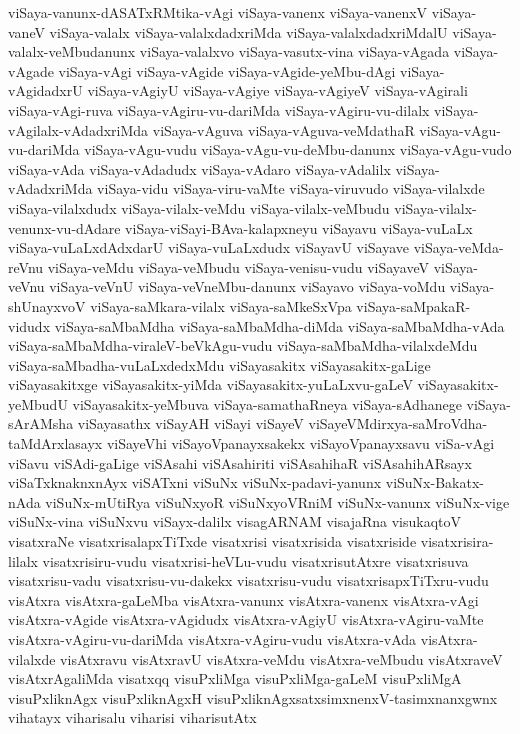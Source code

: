 {viSaya-vanunx-dASATxRMtika-vAgi
viSaya-vanenx
viSaya-vanenxV
viSaya-vaneV
viSaya-valalx
viSaya-valalxdadxriMda
viSaya-valalxdadxriMdalU
viSaya-valalx-veMbudanunx
viSaya-valalxvo
viSaya-vasutx-vina
viSaya-vAgada
viSaya-vAgade
viSaya-vAgi
viSaya-vAgide
viSaya-vAgide-yeMbu-dAgi
viSaya-vAgidadxrU
viSaya-vAgiyU
viSaya-vAgiye
viSaya-vAgiyeV
viSaya-vAgirali
viSaya-vAgi-ruva
viSaya-vAgiru-vu-dariMda
viSaya-vAgiru-vu-dilalx
viSaya-vAgilalx-vAdadxriMda
viSaya-vAguva
viSaya-vAguva-veMdathaR
viSaya-vAgu-vu-dariMda
viSaya-vAgu-vudu
viSaya-vAgu-vu-deMbu-danunx
viSaya-vAgu-vudo
viSaya-vAda
viSaya-vAdadudx
viSaya-vAdaro
viSaya-vAdalilx
viSaya-vAdadxriMda
viSaya-vidu
viSaya-viru-vaMte
viSaya-viruvudo
viSaya-vilalxde
viSaya-vilalxdudx
viSaya-vilalx-veMdu
viSaya-vilalx-veMbudu
viSaya-vilalx-venunx-vu-dAdare
viSaya-viSayi-BAva-kalapxneyu
viSayavu
viSaya-vuLaLx
viSaya-vuLaLxdAdxdarU
viSaya-vuLaLxdudx
viSayavU
viSayave
viSaya-veMda-reVnu
viSaya-veMdu
viSaya-veMbudu
viSaya-venisu-vudu
viSayaveV
viSaya-veVnu
viSaya-veVnU
viSaya-veVneMbu-danunx
viSayavo
viSaya-voMdu
viSaya-shUnayxvoV
viSaya-saMkara-vilalx
viSaya-saMkeSxVpa
viSaya-saMpakaR-vidudx
viSaya-saMbaMdha
viSaya-saMbaMdha-diMda
viSaya-saMbaMdha-vAda
viSaya-saMbaMdha-viraleV-beVkAgu-vudu
viSaya-saMbaMdha-vilalxdeMdu
viSaya-saMbadha-vuLaLxdedxMdu
viSayasakitx
viSayasakitx-gaLige
viSayasakitxge
viSayasakitx-yiMda
viSayasakitx-yuLaLxvu-gaLeV
viSayasakitx-yeMbudU
viSayasakitx-yeMbuva
viSaya-samathaRneya
viSaya-sAdhanege
viSaya-sArAMsha
viSayasathx
viSayAH
viSayi
viSayeV
viSayeVMdirxya-saMroVdha-taMdArxlasayx
viSayeVhi
viSayoVpanayxsakekx
viSayoVpanayxsavu
viSa-vAgi
viSavu
viSAdi-gaLige
viSAsahi
viSAsahiriti
viSAsahihaR
viSAsahihARsayx
viSaTxknaknxnAyx
viSATxni
viSuNx
viSuNx-padavi-yanunx
viSuNx-Bakatx-nAda
viSuNx-mUtiRya
viSuNxyoR
viSuNxyoVRniM
viSuNx-vanunx
viSuNx-vige
viSuNx-vina
viSuNxvu
viSayx-dalilx
visagARNAM
visajaRna
visukaqtoV
visatxraNe
visatxrisalapxTiTxde
visatxrisi
visatxrisida
visatxriside
visatxrisira-lilalx
visatxrisiru-vudu
visatxrisi-heVLu-vudu
visatxrisutAtxre
visatxrisuva
visatxrisu-vadu
visatxrisu-vu-dakekx
visatxrisu-vudu
visatxrisapxTiTxru-vudu
visAtxra
visAtxra-gaLeMba
visAtxra-vanunx
visAtxra-vanenx
visAtxra-vAgi
visAtxra-vAgide
visAtxra-vAgidudx
visAtxra-vAgiyU
visAtxra-vAgiru-vaMte
visAtxra-vAgiru-vu-dariMda
visAtxra-vAgiru-vudu
visAtxra-vAda
visAtxra-vilalxde
visAtxravu
visAtxravU
visAtxra-veMdu
visAtxra-veMbudu
visAtxraveV
visAtxrAgaliMda
visatxqq
visuPxliMga
visuPxliMga-gaLeM
visuPxliMgA
visuPxliknAgx
visuPxliknAgxH
visuPxliknAgxsatxsimxnenxV-tasimxnanxgwnx
vihatayx
viharisalu
viharisi
viharisutAtx
}
